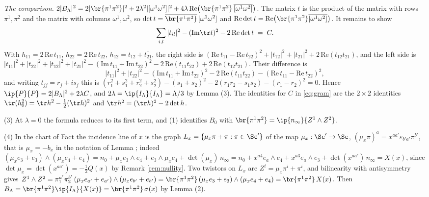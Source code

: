 \emph{The comparison.} $2|B_{\Lambda}|^{2} = 2|\br{\pi^{1}\pi^{2}}|^{2} + 2\lambda^{2}|[\omega^{1}\omega^{2}]|^{2} + 4\lambda\,\mathrm{Re}\bigl(\br{\pi^{1}\pi^{2}}\,\overline{[\omega^{1}\omega^{2}]}\bigr)$. The matrix $t$ is the product of the matrix with rows $\overline{\pi^{1}}, \overline{\pi^{2}}$ and the matrix with columns $\omega^{1}, \omega^{2}$, so $\det t = \overline{\br{\pi^{1}\pi^{2}}}\,[\omega^{1}\omega^{2}]$ and $\mathrm{Re}\det t = \mathrm{Re}\bigl(\br{\pi^{1}\pi^{2}}\overline{[\omega^{1}\omega^{2}]}\bigr)$. It remains to show
\[
\sum_{i,l}|t_{il}|^{2} - (\mathrm{Im}\tr t)^{2} - 2\,\mathrm{Re}\det t \;=\; C .
\]
With $h_{11} = 2\,\mathrm{Re}\,t_{11}$, $h_{22} = 2\,\mathrm{Re}\,t_{22}$, $h_{12} = t_{12} + \overline{t_{21}}$, the right side is $(\mathrm{Re}\,t_{11} - \mathrm{Re}\,t_{22})^{2} + |t_{12}|^{2} + |t_{21}|^{2} + 2\,\mathrm{Re}(t_{12}t_{21})$, and the left side is $|t_{11}|^{2} + |t_{22}|^{2} + |t_{12}|^{2} + |t_{21}|^{2} - (\mathrm{Im}\,t_{11} + \mathrm{Im}\,t_{22})^{2} - 2\,\mathrm{Re}(t_{11}t_{22}) + 2\,\mathrm{Re}(t_{12}t_{21})$. Their difference is
\[
|t_{11}|^{2} + |t_{22}|^{2} - (\mathrm{Im}\,t_{11} + \mathrm{Im}\,t_{22})^{2} - 2\,\mathrm{Re}(t_{11}t_{22}) - (\mathrm{Re}\,t_{11} - \mathrm{Re}\,t_{22})^{2},
\]
and writing $t_{jj} = r_{j} + i s_{j}$ this is $(r_{1}^{2} + s_{1}^{2} + r_{2}^{2} + s_{2}^{2}) - (s_{1} + s_{2})^{2} - 2(r_{1}r_{2} - s_{1}s_{2}) - (r_{1} - r_{2})^{2} = 0$. Hence $\ip{P}{P} = 2|B_{\Lambda}|^{2} + 2\lambda C$, and $2\lambda = \ip{I_{\Lambda}}{I_{\Lambda}} = \Lambda/3$ by Lemma (3). The identities for $C$ in \eqref{eq:gram} are the $2\times 2$ identities $\tr(h_{0}^{2}) = \tr h^{2} - \tfrac12(\tr h)^{2}$ and $\tr h^{2} = (\tr h)^{2} - 2\det h$.

(3) At $\lambda = 0$ the formula reduces to its first term, and (1) identifies $B_{0}$ with $\br{\pi^{1}\pi^{2}} = \ip{n_{\infty}}{Z^{1}\wedge Z^{2}}$.

(4) In the chart of Fact  the incidence line of $x$ is the graph $L_{x} = \{\mu_{x}\pi + \pi : \pi \in \Sc'\}$ of the map $\mu_{x}: \Sc' \to \Sc$, $(\mu_{x}\pi)^{a} = x^{aa'}\varepsilon_{b'a'}\pi^{b'}$, that is $\mu_{x} = -b_{x}$ in the notation of Lemma  \cite[Thm.~4.2]{ButlerT9}; indeed $(\mu_{x}e_{3} + e_{3})\wedge(\mu_{x}e_{4} + e_{4}) = n_{0} + \mu_{x}e_{3}\wedge e_{4} + e_{3}\wedge\mu_{x}e_{4} + \det(\mu_{x})\,n_{\infty} = n_{0} + x^{a4}e_{a}\wedge e_{4} + x^{a3}e_{a}\wedge e_{3} + \det(x^{aa'})\,n_{\infty} = X(x)$, since $\det\mu_{x} = \det(x^{aa'}) = -\tfrac12 Q(x)$ by Remark \ref{rem:nullity}. Two twistors on $L_{x}$ are $Z^{i} = \mu_{x}\pi^{i} + \pi^{i}$, and bilinearity with antisymmetry gives $Z^{1}\wedge Z^{2} = \pi_{1}^{a'}\pi_{2}^{b'}\,(\mu_{x}e_{a'} + e_{a'})\wedge(\mu_{x}e_{b'} + e_{b'}) = \br{\pi^{1}\pi^{2}}\,(\mu_{x}e_{3} + e_{3})\wedge(\mu_{x}e_{4} + e_{4}) = \br{\pi^{1}\pi^{2}}\,X(x)$. Then $B_{\Lambda} = \br{\pi^{1}\pi^{2}}\ip{I_{\Lambda}}{X(x)} = \br{\pi^{1}\pi^{2}}\,\sigma(x)$ by Lemma (2).


